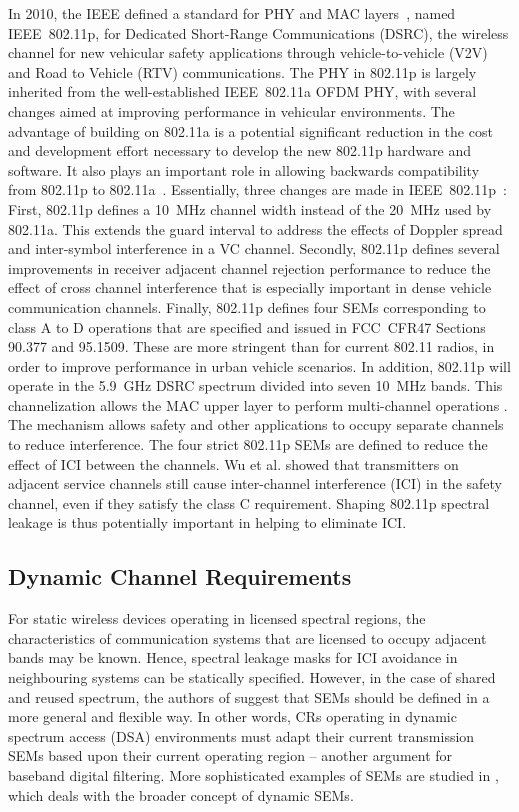 In 2010, the IEEE defined a standard for PHY and MAC layers~\cite{802-11p2010}, named IEEE~802.11p, for Dedicated Short-Range Communications (DSRC), the wireless channel for new vehicular safety applications through vehicle-to-vehicle (V2V) and Road to Vehicle (RTV) communications.
The PHY in 802.11p is largely inherited from the well-established IEEE~802.11a OFDM PHY, with several changes aimed at improving performance in vehicular environments.
The advantage of building on 802.11a is a potential significant reduction in the cost and development effort necessary to develop the new 802.11p hardware and software.
It also plays an important role in allowing backwards compatibility from 802.11p to 802.11a~\cite{Vandenberghe2011,Fernandez2012}.
Essentially, three changes are made in IEEE~802.11p~\cite{Jiang2008}:
First, 802.11p defines a 10~MHz channel width instead of the 20~MHz used by 802.11a.
This extends the guard interval to address the effects of Doppler spread and inter-symbol interference in a VC channel.
Secondly, 802.11p defines several improvements in receiver adjacent channel rejection performance to reduce the effect of cross channel interference that is especially important in dense vehicle communication channels.
Finally, 802.11p defines four SEMs corresponding to class A to D operations that are specified and issued in FCC~CFR47 Sections 90.377 and 95.1509.
These are more stringent than for current 802.11 radios, in order to improve performance in urban vehicle scenarios.
In addition, 802.11p will operate in the 5.9~GHz DSRC spectrum divided into seven 10~MHz bands. 
This channelization allows the MAC upper layer to perform multi-channel operations \cite{WAVE2010}.
The mechanism allows safety and other applications to occupy separate channels to reduce interference.
The four strict 802.11p SEMs are defined to reduce the effect of ICI between the channels. %
Wu et al. \cite{Wu2013} showed that transmitters on adjacent service channels still cause inter-channel interference (ICI) in the safety channel, even if they satisfy the class C requirement.
Shaping 802.11p  spectral leakage is thus potentially important in helping to eliminate ICI.

\subsection{Dynamic Channel Requirements}
For static wireless devices operating in licensed spectral regions, the characteristics of communication systems that are licensed to occupy adjacent bands may be known.
Hence, spectral leakage masks for ICI avoidance in neighbouring systems can be statically specified.
However, in the case of shared and reused spectrum, the authors of \cite{Macaluso2014} suggest that SEMs should be defined in a more general and flexible way.
In other words, CRs operating in dynamic spectrum access (DSA) environments must adapt their current transmission SEMs based upon their current operating region -- another argument for baseband digital filtering.
More sophisticated examples of SEMs are studied in \cite{Forde2010}, which deals with the broader concept of dynamic SEMs.

